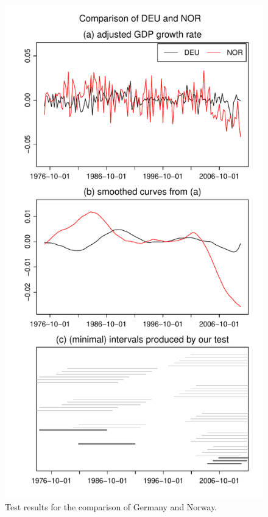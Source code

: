 \documentclass[12pt]{article}
\begin{document}
\begin{figure}
\begin{minipage}[t]{0.24\textwidth}
\includegraphics[width=\textwidth]{output/plots/gdp/DEU_vs_NOR}
\caption{Test results for the comparison of Germany and Norway.}\label{fig:Germany:Norway}
\end{minipage}
\hspace{0.1cm}

\end{figure}
\end{document}
